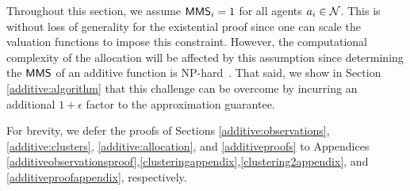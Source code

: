 Throughout this section, we assume $\mathsf{MMS}_i = 1$ for all agents $a_i \in \mathcal{N}$. This is without loss of generality for the existential proof since one can scale the valuation functions to impose this constraint. However, the computational complexity of the allocation will be affected by this assumption since determining the $\mathsf{MMS}$ of an additive function is NP-hard~\cite{epstein2014efficient}. That said, we show in Section \ref{additive:algorithm} that this challenge can be overcome by incurring an additional $1+\epsilon$ factor to the approximation guarantee.  

For brevity, we defer the proofs of Sections \ref{additive:observations}, \ref{additive:clusters}, \ref{additive:allocation}, and \ref{additiveproofs} to Appendices \ref{additiveobservationsproof},\ref{clusteringappendix},\ref{clustering2appendix}, and \ref{additiveproofappendix}, respectively.






